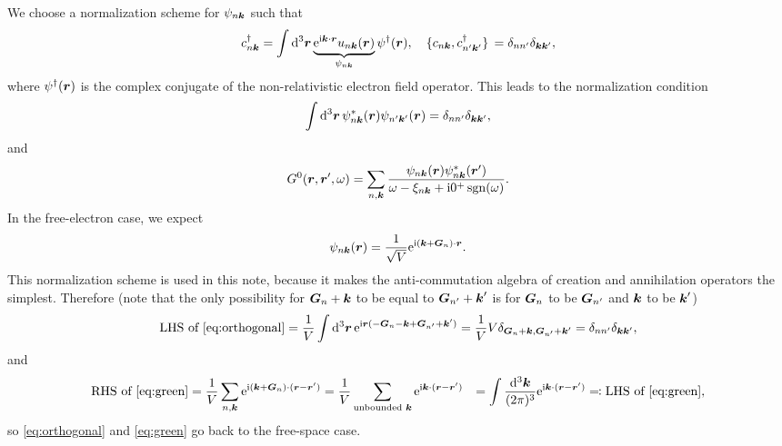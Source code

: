 \documentclass[hyperref, a4paper, 12pt]{report}
\DeclareMathOperator{\sgn}{sgn}
\newcommand*{\ii}{\mathrm{i}}
\newcommand*{\ee}{\mathrm{e}}
\def\\{}%
\begin{document}
We choose a normalization scheme for $\psi_{n \vb*{k}}$ such that 
\begin{equation}
    c^\dagger_{n \vb*{k}} = \int \dd[3]{\vb*{r}} 
    \underbrace{\ee^{\ii \vb*{k} \cdot \vb*{r}} u_{n \vb*{k}}(\vb*{r})}_{\psi_{n \vb*{k}}} 
    \psi^\dagger(\vb*{r}),
    \quad \acomm*{c_{n \vb*{k}}}{c^\dagger_{n' \vb*{k}'}} = \delta_{n n'} \delta_{\vb*{k} \vb*{k}'},
\end{equation}
where $\psi^\dagger(\vb*{r})$ is the complex conjugate 
of the non-relativistic electron field operator.
This leads to the normalization condition 
\begin{equation}
    \int \dd[3]{\vb*{r}} \psi^*_{n \vb*{k}}(\vb*{r}) \psi_{n' \vb*{k}'}(\vb*{r}) 
    = \delta_{n n'} \delta_{\vb*{k} \vb*{k}'},
    \label{eq:orthogonal}
\end{equation}
and
\begin{equation}
    G^0(\vb*{r}, \vb*{r}', \omega) = \sum_{n, \vb*{k}} \frac{
        \psi_{n \vb*{k}}(\vb*{r}) \psi^*_{n \vb*{k}}(\vb*{r}')
    }{\omega - \xi_{n \vb*{k}} + \ii 0^+ \sgn(\omega)}.
    \label{eq:green}
\end{equation}
In the free-electron case, 
we expect 
\begin{equation}
    \psi_{n \vb*{k}}(\vb*{r}) = \frac{1}{\sqrt{V}} \ee^{\ii (\vb*{k} + \vb*{G}_n) \cdot \vb*{r}}.
\end{equation}
This normalization scheme is used in this note, 
because it makes the anti-commutation algebra 
of creation and annihilation operators the simplest.
Therefore (note that the only possibility for $\vb*{G}_n + \vb*{k}$
to be equal to $\vb*{G}_{n'} + \vb*{k}'$
is for $\vb*{G}_n$ to be $\vb*{G}_{n'}$
and $\vb*{k}$ to be $\vb*{k}'$)
\[
    \text{LHS of \eqref{eq:orthogonal}} = 
    \frac{1}{V} \int \dd[3]{\vb*{r}} \ee^{\ii \vb*{r} (
        - \vb*{G}_n - \vb*{k} + \vb*{G}_{n'} + \vb*{k}'
    )} = 
    \frac{1}{V} V \delta_{\vb*{G}_n + \vb*{k}, \vb*{G}_{n'} + \vb*{k}'} 
    = \delta_{n n'} \delta_{\vb*{k} \vb*{k}'},
\]
and 
\[
    \begin{aligned}
        \text{RHS of \eqref{eq:green}} &= 
        \frac{1}{V} \sum_{n, \vb*{k}} 
        \ee^{\ii (\vb*{k} + \vb*{G}_n) \cdot (\vb*{r} - \vb*{r}')} 
        = \frac{1}{V} \sum_{\text{unbounded $\vb*{k}$}} 
        \ee^{\ii \vb*{k} \cdot (\vb*{r} - \vb*{r}')} \\
        &= \int \frac{\dd[3]{\vb*{k}}}{(2\pi)^3}
        \ee^{\ii \vb*{k} \cdot (\vb*{r} - \vb*{r}')}
        \eqqcolon \text{LHS of \eqref{eq:green}}, 
    \end{aligned}
\]
so \eqref{eq:orthogonal} and \eqref{eq:green}
go back to the free-space case.
\end{document}
